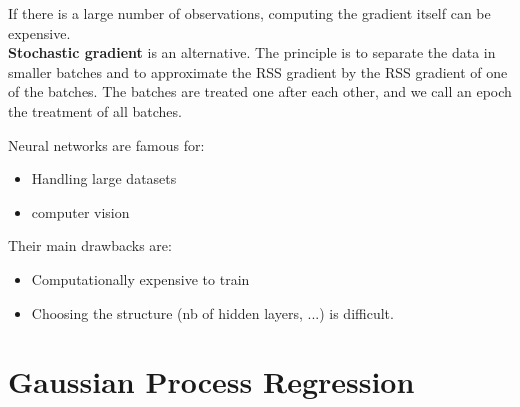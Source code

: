 \documentclass{beamer}
\begin{document}
\begin{frame}{}
If there is a large number of observations, computing the gradient itself can be expensive. \\ \vspace{3mm}
\textbf{Stochastic gradient} is an alternative. The principle is to separate the data in smaller batches and to approximate the RSS gradient by the RSS gradient of one of the batches. The batches are treated one after each other, and we call an epoch the treatment of all batches.
\end{frame}

\begin{frame}{}
Neural networks are famous for:
\begin{itemize}
  \item Handling large datasets
  \item computer vision
\end{itemize}
\vspace{3mm}
Their main drawbacks are:
\begin{itemize}
  \item Computationally expensive to train
  \item Choosing the structure (nb of hidden layers, ...) is difficult.
\end{itemize}
\end{frame}

\section{Gaussian Process Regression}
\subsection{}
\end{document}
